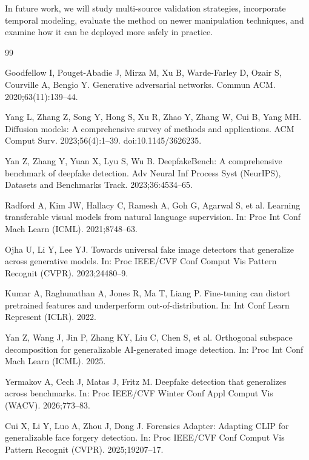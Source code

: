 \documentclass[fonts]{icst}
\begin{document}
In future work, we will study multi-source validation strategies, incorporate temporal modeling, evaluate the method on newer manipulation techniques, and examine how it can be deployed more safely in practice.


\begin{thebibliography}{99}
\balance

Goodfellow I, Pouget-Abadie J, Mirza M, Xu B, Warde-Farley D, Ozair S, Courville A, Bengio Y.
Generative adversarial networks.
Commun ACM. 2020;63(11):139--44.

Yang L, Zhang Z, Song Y, Hong S, Xu R, Zhao Y, Zhang W, Cui B, Yang MH.
Diffusion models: A comprehensive survey of methods and applications.
ACM Comput Surv. 2023;56(4):1--39. doi:10.1145/3626235.

Yan Z, Zhang Y, Yuan X, Lyu S, Wu B.
DeepfakeBench: A comprehensive benchmark of deepfake detection.
Adv Neural Inf Process Syst (NeurIPS), Datasets and Benchmarks Track. 2023;36:4534--65.

Radford A, Kim JW, Hallacy C, Ramesh A, Goh G, Agarwal S, et al.
Learning transferable visual models from natural language supervision.
In: Proc Int Conf Mach Learn (ICML). 2021;8748--63.

Ojha U, Li Y, Lee YJ.
Towards universal fake image detectors that generalize across generative models.
In: Proc IEEE/CVF Conf Comput Vis Pattern Recognit (CVPR). 2023;24480--9.

Kumar A, Raghunathan A, Jones R, Ma T, Liang P.
Fine-tuning can distort pretrained features and underperform out-of-distribution.
In: Int Conf Learn Represent (ICLR). 2022.

Yan Z, Wang J, Jin P, Zhang KY, Liu C, Chen S, et al.
Orthogonal subspace decomposition for generalizable AI-generated image detection.
In: Proc Int Conf Mach Learn (ICML). 2025.

Yermakov A, Cech J, Matas J, Fritz M.
Deepfake detection that generalizes across benchmarks.
In: Proc IEEE/CVF Winter Conf Appl Comput Vis (WACV). 2026;773--83.

Cui X, Li Y, Luo A, Zhou J, Dong J.
Forensics Adapter: Adapting CLIP for generalizable face forgery detection.
In: Proc IEEE/CVF Conf Comput Vis Pattern Recognit (CVPR). 2025;19207--17.


\end{thebibliography}
\end{document}
